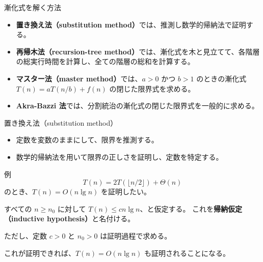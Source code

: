 \documentclass[unicode,11pt,aspectratio=169,notes]{beamer} %
\begin{document}
\begin{frame}
  \sectionpage{}
\end{frame}

\begin{frame}{漸化式を解く方法}
  \begin{itemize}
    \item \textbf{置き換え法（substitution method）}では、推測し数学的帰納法で証明する。
    \item \textbf{再帰木法（recursion-tree method）}では、漸化式を木と見立てて、各階層
    の総実行時間を計算し、全ての階層の総和を計算する。
    \item \textbf{マスター法（master method）}では、$a>0$ かつ $b>1$ のときの漸化式
    $T(n) = aT(n/b)+f(n)$ の閉じた限界式を求める。
    \item \textbf{Akra-Bazzi 法}では、分割統治の漸化式の閉じた限界式を一般的に求める。
  \end{itemize}
\end{frame}

\begin{frame}{置き換え法（substitution method）}
  \begin{itemize}
    \item 定数を変数のままにして、限界を推測する。
    \item 数学的帰納法を用いて限界の正しさを証明し、定数を特定する。
  \end{itemize}
\end{frame}

\begin{frame}{例}
  \begin{equation}\label{eq:rec}
    T(n)=2T(\lfloor n/2\rfloor)+\Theta(n)
  \end{equation}
  のとき、$T(n)=O(n\lg n)$ を証明したい。

  \vspace{5mm}

  すべての $n\geq n_0$ に対して $T(n)\leq cn\lg n$、と仮定する。
  これを\textbf{帰納仮定（inductive hypothesis）}と名付ける。
  
  ただし、定数 $c>0$ と $n_0>0$ は証明過程で求める。

  \vspace{5mm}

  これが証明できれば、$T(n)=O(n\lg n)$ も証明されることになる。
\end{frame}

\end{document}
